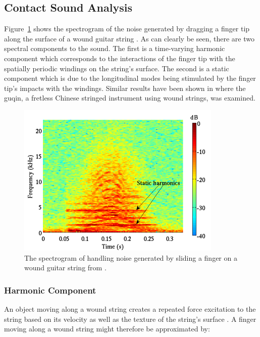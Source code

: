 \documentclass[main.tex]{subfiles}
\begin{document}
\subsection{Contact Sound Analysis}
Figure~\ref{fig:finger_noise_spectrogram} shows the spectrogram of the noise generated by dragging a finger tip along the surface of a wound guitar string . As can clearly be seen, there are two spectral components to the sound. The first is a time-varying harmonic component which corresponds to the interactions of the finger tip with the spatially periodic windings on the string's surface. The second is a static component which is due to the longitudinal modes being stimulated by the finger tip's impacts with the windings. Similar results have been shown in  where the guqin, a fretless Chinese stringed instrument using wound strings, was examined.

\begin{figure}[h]
    \centering
    \includegraphics[scale=1]{./images/pictures/finger-noise-spectrogram.png}
    \caption{The spectrogram of handling noise generated by sliding a finger on a wound guitar string from .}
    \label{fig:finger_noise_spectrogram}
\end{figure}

\subsubsection{Harmonic Component}
An object moving along a wound string creates a repeated force excitation to the string based on its velocity as well as the texture of the string's surface . A finger moving along a wound string might therefore be approximated by:
\end{document}
